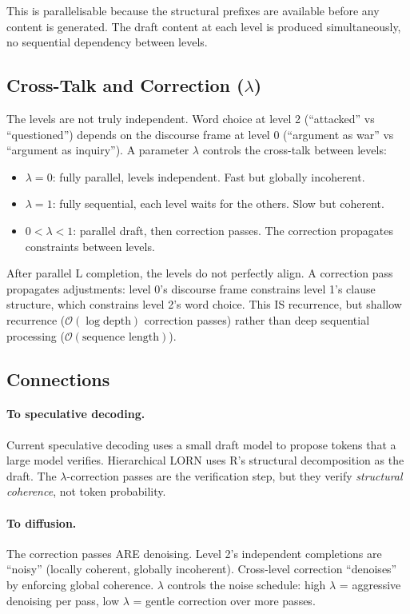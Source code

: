 \documentclass[11pt, a4paper]{article}
\theoremstyle{plain}
\theoremstyle{definition}
\theoremstyle{remark}
\begin{document}
This is parallelisable because the structural prefixes are available before any content is generated.
The draft content at each level is produced simultaneously, no sequential dependency between levels.

\subsection{Cross-Talk and Correction ($\lambda$)}

The levels are not truly independent.
Word choice at level 2 (``attacked'' vs ``questioned'') depends on the discourse frame at level 0 (``argument as war'' vs ``argument as inquiry'').
A parameter $\lambda$ controls the cross-talk between levels:

\begin{itemize}[nosep]
\item $\lambda = 0$: fully parallel, levels independent. Fast but globally incoherent.
\item $\lambda = 1$: fully sequential, each level waits for the others. Slow but coherent.
\item $0 < \lambda < 1$: parallel draft, then correction passes. The correction propagates constraints between levels.
\end{itemize}

After parallel L completion, the levels do not perfectly align.
A correction pass propagates adjustments: level 0's discourse frame constrains level 1's clause structure, which constrains level 2's word choice.
This IS recurrence, but shallow recurrence ($\mathcal{O}(\log \text{depth})$ correction passes) rather than deep sequential processing ($\mathcal{O}(\text{sequence length})$).

\subsection{Connections}

\paragraph{To speculative decoding.}
Current speculative decoding uses a small draft model to propose tokens that a large model verifies.
Hierarchical LORN uses R's structural decomposition as the draft.
The $\lambda$-correction passes are the verification step, but they verify \emph{structural coherence}, not token probability.

\paragraph{To diffusion.}
The correction passes ARE denoising.
Level 2's independent completions are ``noisy'' (locally coherent, globally incoherent).
Cross-level correction ``denoises'' by enforcing global coherence.
$\lambda$ controls the noise schedule: high $\lambda$ = aggressive denoising per pass, low $\lambda$ = gentle correction over more passes.
\end{document}
